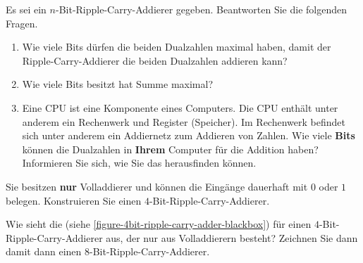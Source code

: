 \newpage

\begin{exercise}
Es sei ein $n$-Bit-Ripple-Carry-Addierer gegeben. Beantworten Sie die folgenden Fragen.
\begin{enumerate}
\item Wie viele Bits dürfen die beiden Dualzahlen maximal haben, damit der Ripple-Carry-Addierer die beiden Dualzahlen addieren kann?

\fillwithgrid	{0.5in}

\item Wie viele Bits besitzt hat Summe maximal?

\fillwithgrid	{0.5in}

\item Eine \ac{CPU} ist eine Komponente eines Computers. Die \ac{CPU} enthält unter anderem ein Rechenwerk und Register (Speicher). Im Rechenwerk befindet sich unter anderem ein Addiernetz zum Addieren von Zahlen. Wie viele \textbf{Bits} können die Dualzahlen in \textbf{Ihrem} Computer für die Addition haben? Informieren Sie sich, wie Sie das herausfinden können.

\fillwithgrid	{1.5in}

\end{enumerate}
\end{exercise}

\begin{exercise}
Sie besitzen \textbf{nur} Volladdierer und können die Eingänge dauerhaft mit $0$ oder $1$ belegen. Konstruieren Sie einen $4$-Bit-Ripple-Carry-Addierer.
\fillwithgrid	{1.5in}
\end{exercise}

\begin{exercise}
Wie sieht die  (siehe \autoref{figure-4bit-ripple-carry-adder-blackbox}) für einen $4$-Bit-Ripple-Carry-Addierer aus, der nur aus Volladdierern besteht? Zeichnen Sie dann damit dann einen $8$-Bit-Ripple-Carry-Addierer.
\end{exercise}